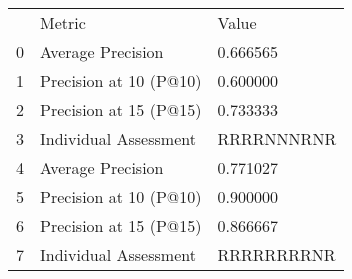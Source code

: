\begin{tabular}{lll}
 & Metric & Value \\
0 & Average Precision & 0.666565 \\
1 & Precision at 10 (P@10) & 0.600000 \\
2 & Precision at 15 (P@15) & 0.733333 \\
3 & Individual Assessment & RRRRNNNRNR \\
4 & Average Precision & 0.771027 \\
5 & Precision at 10 (P@10) & 0.900000 \\
6 & Precision at 15 (P@15) & 0.866667 \\
7 & Individual Assessment & RRRRRRRRNR \\
\end{tabular}
